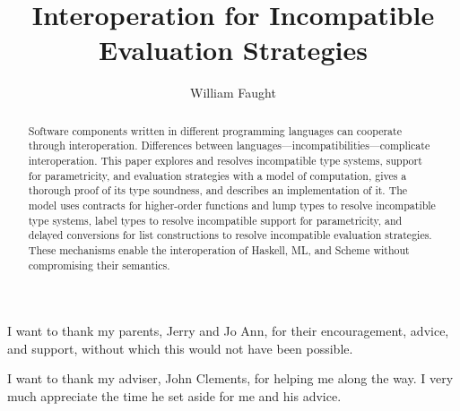 \documentclass[12pt]{ucthesis}
\begin{document}
\title{Interoperation for Incompatible Evaluation Strategies}
\author{William Faught}
\maketitle
\begin{frontmatter}
\copyrightpage
\approvalpage
\begin{abstract}
Software components written in different programming languages can cooperate through interoperation.  Differences between languages---incompatibilities---complicate interoperation.  This paper explores and resolves incompatible type systems, support for parametricity, and evaluation strategies with a model of computation, gives a thorough proof of its type soundness, and describes an implementation of it.  The model uses contracts for higher-order functions and lump types to resolve incompatible type systems, label types to resolve incompatible support for parametricity, and delayed conversions for list constructions to resolve incompatible evaluation strategies.  These mechanisms enable the interoperation of Haskell, ML, and Scheme without compromising their semantics.
\end{abstract}
\begin{acknowledgements}
\indent\indent I want to thank my parents, Jerry and Jo Ann, for their encouragement, advice, and support, without which this would not have been possible.

I want to thank my adviser, John Clements, for helping me along the way.  I very much appreciate the time he set aside for me and his advice.
\end{acknowledgements}
\tableofcontents
\listoffigures
\end{frontmatter}
\pagestyle{plain}
\renewcommand{\baselinestretch}{1.66}








\clearpage


\end{document}

